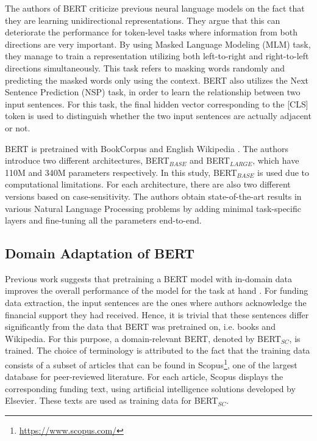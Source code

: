 \documentclass{report}
\theoremstyle{definition}
\theoremstyle{remark}
\begin{document}
The authors of BERT criticize previous neural language models on the fact that they are learning unidirectional representations. They argue that this can deteriorate the performance for token-level tasks where information from both directions are very important. By using Masked Language Modeling (MLM) task, they manage to train a representation utilizing both left-to-right and right-to-left directions simultaneously. This task refers to masking words randomly and predicting the masked words only using the context. BERT also utilizes the Next Sentence Prediction (NSP) task, in order to learn the relationship between two input sentences. For this task, the final hidden vector corresponding to the [CLS] token is used to distinguish whether the two input sentences are actually adjacent or not.

BERT is pretrained with BookCorpus \cite{bookscorpus} and English Wikipedia \cite{BERT}. The authors introduce two different architectures, BERT$_{BASE}$ and BERT$_{LARGE}$, which have 110M and 340M parameters respectively. In this study, BERT$_{BASE}$ is used due to computational limitations. For each architecture, there are also two different versions based on case-sensitivity. The authors obtain state-of-the-art results in various Natural Language Processing problems by adding minimal task-specific layers and fine-tuning all the parameters end-to-end.

\subsection{Domain Adaptation of BERT}
Previous work suggests that pretraining a BERT model with in-domain data improves the overall performance of the model for the task at hand \textcolor{red}{\cite{}}. For funding data extraction, the input sentences are the ones where authors acknowledge the financial support they had received. Hence, it is trivial that these sentences differ significantly from the data that BERT was pretrained on, i.e. books and Wikipedia.  For this purpose, a domain-relevant BERT, denoted by BERT$_{SC}$, is trained. The choice of terminology is attributed to the fact that the training data consists of a subset of articles that can be found in Scopus\footnote{\url{https://www.scopus.com/}}, one of the largest database for peer-reviewed literature. For each article, Scopus displays the corresponding funding text, using artificial intelligence solutions developed by Elsevier. These texts are used as training data for BERT$_{SC}$.
\end{document}
